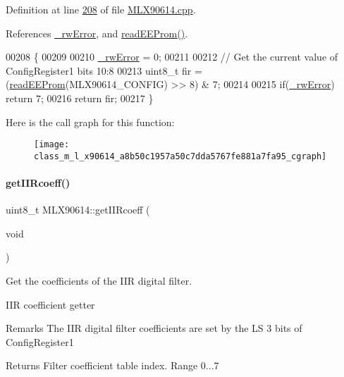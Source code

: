 Definition at line \mbox{\hyperlink{_m_l_x90614_8cpp_source_l00208}{208}} of file \mbox{\hyperlink{_m_l_x90614_8cpp_source}{M\+L\+X90614.\+cpp}}.



References \mbox{\hyperlink{_m_l_x90614_8h_source_l00146}{\+\_\+rw\+Error}}, and \mbox{\hyperlink{_m_l_x90614_8cpp_source_l00344}{read\+E\+E\+Prom()}}.


\begin{DoxyCode}
00208                                   \{
00209 
00210     \mbox{\hyperlink{class_m_l_x90614_a8c203cc9359c283d07682ba7dbcc5de3}{\_rwError}} = 0;
00211 
00212     \textcolor{comment}{// Get the current value of ConfigRegister1 bits 10:8}
00213     uint8\_t fir = (\mbox{\hyperlink{class_m_l_x90614_aab0a010875527f4ac3d2794017624b10}{readEEProm}}(MLX90614\_CONFIG) >> 8) & 7;
00214 
00215     \textcolor{keywordflow}{if}(\mbox{\hyperlink{class_m_l_x90614_a8c203cc9359c283d07682ba7dbcc5de3}{\_rwError}}) \textcolor{keywordflow}{return} 7;
00216     \textcolor{keywordflow}{return} fir;
00217 \}
\end{DoxyCode}
Here is the call graph for this function\+:\nopagebreak
\begin{figure}[H]
\begin{center}
\leavevmode
\texttt{[image: class\_m\_l\_x90614\_a8b50c1957a50c7dda5767fe881a7fa95\_cgraph]}
\end{center}
\end{figure}
\mbox{\label{class_m_l_x90614_ac04578d67760dd73df4ed023d9b97896}} 
\paragraph{\texorpdfstring{get\+I\+I\+Rcoeff()}{getIIRcoeff()}}
{\footnotesize\ttfamily uint8\+\_\+t M\+L\+X90614\+::get\+I\+I\+Rcoeff (\begin{DoxyParamCaption}\item[{void}]{ }\end{DoxyParamCaption})}



Get the coefficients of the I\+IR digital filter. 

I\+IR coefficient getter

\begin{DoxyRemark}{Remarks}
The I\+IR digital filter coefficients are set by the LS 3 bits of Config\+Register1 
\end{DoxyRemark}
\begin{DoxyReturn}{Returns}
Filter coefficient table index. Range 0...7 
\end{DoxyReturn}


